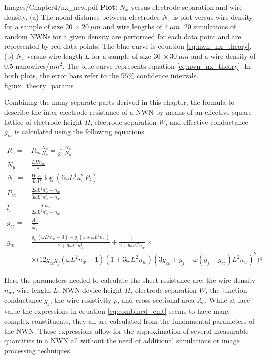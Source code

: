 {Images/Chapter4/nx_new.pdf}
{\textbf{Plot:} $N_x$ versus electrode separation and wire density.}
{(a) The nodal distance between electrodes $N_x$ is plot versus wire density for a sample of size $20~  \times 20~\mu m$ and wire lengths of $7~\mu m$. 20 simulations of random NWNs for a given density are performed for each data point and are represented by red data points. The blue curve is equation \ref{eq:nwn_nx_theory}. (b) $N_x$ versus wire length $L$ for a sample of size $30~\times 30~\mu m$ and a wire density of $0.5$ nanowires/$\mu m^2$. The blue curve represents equation \ref{eq:nwn_nx_theory}. In both plots, the error bars refer to the $95\%$ confidence intervals. }
{fig:nx_theory_params}

Combining the many separate parts derived in this chapter, the formula to describe the inter-electrode resistance of a NWN by means of an effective square lattice of electrode height $H$, electrode separation $W$, and effective conductance $g_m$ is calculated using the following equations
\begin{center}
\begin{align}
R_e = &R_m \frac{N_x}{N_y} = \frac{1}{g_m} \frac{N_x}{N_y} \nonumber\\
N_y = &\frac{L H n_w}{\pi}\nonumber \\
N_x = &\frac{W}{L} \frac{\kappa}{P_i} \log (6 \omega L^4 n_w^2 P_i) \nonumber \\
P_{cc} = &\frac{2 \omega L^2 n_w^2 - n_w}{3 \omega L^2 n_w^2 + n_w} \nonumber \\
\tilde{l}_s = &\frac{L n_w}{2 \omega L^2 n_w^2 + n_w}\nonumber \\
g_{cc} = &\frac{A_c}{\rho \tilde{l}_s} \nonumber \\
g_m = &\frac{g_{cc}(\omega L^2 n_w -3) - g_j (1 + \omega L^2 n_w)}{2+6\omega L^2 n_w^2} +\frac{1}{2+6\omega L^2 n_w} \times \nonumber \\
&\times \Big( 12 g_{cc} g_j(\omega L^2 n_w -1)(1+3\omega L^2 n_w) (3 g_{cc} +g_j +\omega(g_j-g_{cc})L^2 n_w)^2 \Big)^{\frac{1}{2}} 
\label{eq:combined_emt}
\end{align}
\end{center}
Here the parameters needed to calculate the sheet resistance are: the wire density $n_w$, wire length $L$, NWN device height $H$, electrode separation $W$, the junction conductance $g_j$, the wire resistivity $\rho$, and cross sectional area $A_c$. While at face value the expressions in equation \ref{eq:combined_emt} seems to have many complex constituents, they all are calculated from the fundamental parameters of the NWN. These expressions allow for the approximation of several measurable quantities in a NWN all without the need of additional simulations or image processing techniques.
